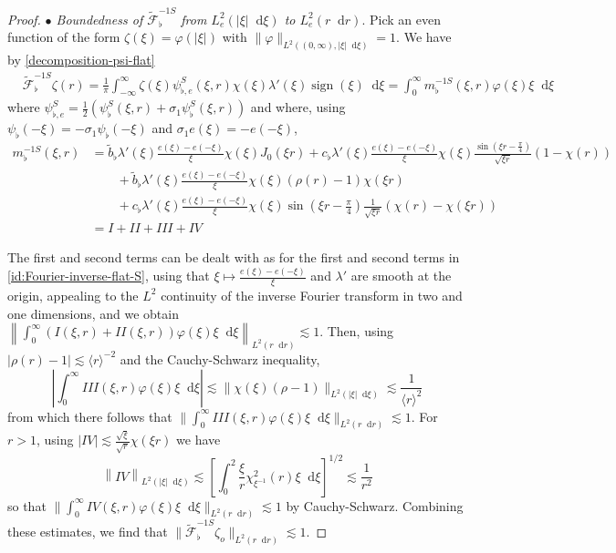 \documentclass[11 pt]{amsart}
\theoremstyle{definition}
\theoremstyle{remark}
\numberwithin{equation}{section}
\newcommand{\dd}{\mathop{}\!\mathrm{d}}
\begin{document}
\begin{proof}
\noindent \textit{$\bullet$ Boundedness of $\widetilde{\mathcal F}_\flat^{-1S}$ from $ L^2_{e}(|\xi|\dd \xi)$ to $L^2_{e}(r\dd r)$}. Pick an even function of the form $\zeta(\xi) = \varphi(|\xi|) $ with $\| \varphi\|_{L^2((0,\infty),|\xi|\dd \xi)}= 1$. We have by \eqref{decomposition-psi-flat}
\begin{align*}
&\widetilde {\mathcal F}_\flat ^{-1S} \zeta (r) =\frac 1 \pi \int_{-\infty}^\infty \zeta(\xi) \psi_{\flat,e}^S (\xi,r) \chi(\xi) \lambda'(\xi) \operatorname{sign}( \xi) \dd \xi= \int_0^\infty m^{-1S}_{\flat}(\xi,r) \varphi(\xi)\xi \dd \xi
\end{align*}
where $\psi_{\flat,e}^S=\frac12(\psi_{\flat}^S(\xi,r)+\sigma_1 \psi_\flat^S(\xi,r))$ and where, using $\psi_{\flat}(-\xi)=-\sigma_1 \psi_{\flat}(-\xi)$ and $\sigma_1e(\xi)=-e(-\xi)$,
\begin{align} 
\label{decomposition-m-flat--1S-L2} m_\flat^{-1S}(\xi,r) & = \widetilde b_\flat \lambda'(\xi)  \frac{e(\xi)-e(-\xi)}{\xi}\chi(\xi)J_0(\xi r) +c_\flat \lambda'(\xi) \frac{e(\xi)-e(-\xi)}{\xi}\chi(\xi)  \frac{\sin (\xi r-\frac \pi 4)}{\sqrt{\xi r}}(1-\chi(r)) \\
\nonumber & \qquad  +  \widetilde b_\flat \lambda'(\xi) \frac{e(\xi)-e(-\xi)}{\xi} \chi(\xi) (\rho(r)-1)\chi(\xi r)  \\
\nonumber & \qquad +c_\flat \lambda'(\xi) \frac{e(\xi)-e(-\xi)}{\xi}\chi(\xi)   \sin (\xi r-\frac \pi 4) \frac{1}{\sqrt{\xi r}} \left(\chi (r)-\chi(\xi r)\right)\ \\
\nonumber & = I+II+III+IV
\end{align}

The first and second terms can be dealt with as for the first and second terms in \eqref{id:Fourier-inverse-flat-S}, using that $\xi \mapsto \frac{e(\xi)-e(-\xi)}{\xi}$ and $\lambda'$ are smooth at the origin, appealing to the $L^2$ continuity of the inverse Fourier transform in two and one dimensions, and we obtain $\left\| \int_0^\infty (I(\xi,r)+II(\xi,r))  \varphi(\xi)\xi \dd \xi  \right\|_{L^2(r\dd r)} \lesssim 1$. Then, using $|\rho(r)-1|\lesssim \langle r \rangle^{-2}$ and the Cauchy-Schwarz inequality,
$$
\left| \int_0^\infty III(\xi,r) \varphi(\xi)\xi \dd \xi \right| \lesssim  \| \chi(\xi) (\rho-1) \|_{L^2(|\xi| \dd \xi)} \lesssim \frac{1}{\langle r\rangle^2}
$$
from which there follows that $\| \int_0^\infty III(\xi,r) \varphi(\xi)\xi \dd \xi   \|_{L^2(r\dd r)} \lesssim 1$. For $r>1$, using $|IV|\lesssim \frac{\sqrt{\xi}}{\sqrt{r}}\chi(\xi r)$ we have
$$
\left\| IV  \right\|_{L^2(|\xi| \dd \xi)} \lesssim \left[ \int_0^2 \frac{\xi}{r}\chi_{\xi^{-1}}^2(r)  \xi \dd \xi \right]^{1/2} \lesssim \frac{1}{r^{2}}
$$
so that $\| \int_0^\infty IV(\xi,r) \varphi(\xi)\xi \dd \xi  \|_{L^2(r \dd r)} \lesssim 1$ by Cauchy-Schwarz. Combining these estimates, we find that $ \| \widetilde{\mathcal F}_\flat^{-1S} \zeta_o \|_{L^2(r \dd r)} \lesssim 1$.


\end{proof}
\end{document}
